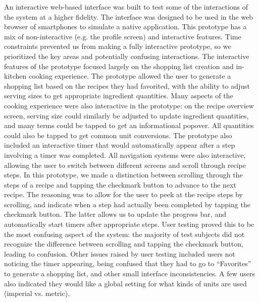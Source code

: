 \documentclass{sigchi}
\begin{document}
An interactive web-based interface was built to test some of the interactions of the system at a higher fidelity. The interface was designed to be used in the web browser of smartphones to simulate a native application. This prototype has a mix of non-interactive (e.g. the profile screen)  and interactive features. Time constraints prevented us from making a fully interactive prototype, so we prioritized the key areas and potentially confusing interactions. The interactive features of the prototype focused largely on the shopping list creation and in-kitchen cooking experience. \newline \newline
The prototype allowed the user to generate a shopping list based on the recipes they had favorited, with the ability to adjust serving sizes to get appropriate ingredient quantities. Many aspects of the cooking experience were also interactive in the prototype: on the recipe overview screen, serving size could similarly be adjusted to update ingredient quantities, and many terms could be tapped to get an informational popover. All quantities could also be tapped to get common unit conversions. The prototype also included an interactive timer that would automatically appear after a step involving a timer was completed. All navigation systems were also interactive, allowing the user to switch between different screens and scroll through recipe steps. \newline \newline
In this prototype, we made a distinction between scrolling through the steps of a recipe and tapping the checkmark button to advance to the next recipe. The reasoning was to allow for the user to peek at the recipe steps by scrolling, and indicate when a step had actually been completed by tapping the checkmark button. The latter allows us to update the progress bar, and automatically start timers after appropriate steps. User testing proved this to be the most confusing aspect of the system: the majority of test subjects did not recognize the difference between scrolling and tapping the checkmark button, leading to confusion. \newline \newline
Other issues raised by user testing included users not noticing the timer appearing, being confused that they had to go to “Favorites” to generate a shopping list, and other small interface inconsistencies. A few users also indicated they would like a global setting for what kinds of units are used (imperial vs. metric).
\end{document}
